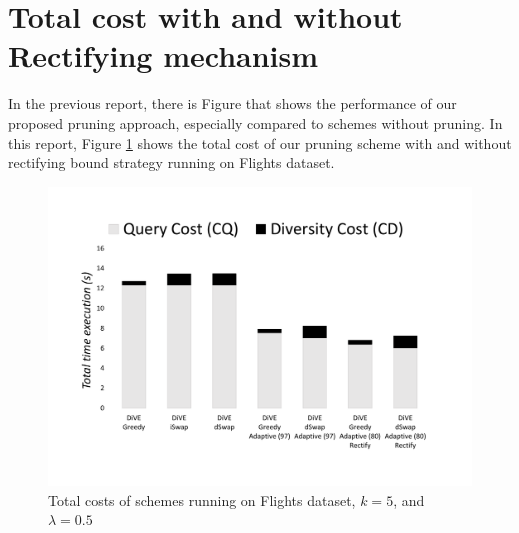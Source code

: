 \documentclass{article}
\begin{document}
%		


\section{Total cost with and without Rectifying mechanism}
In the previous report, there is Figure that shows the performance of our proposed pruning approach, especially compared to schemes without pruning. In this report, Figure \ref{fig:flight_costs_all_rectifying} shows the total cost of our pruning scheme with and without rectifying bound strategy running on Flights dataset. 

\begin{figure}
	\begin{center}
		
		\includegraphics[width=7.0in]{figures/flight_costs_rectifying}
		\vspace{-40pt}
		\caption{Total costs of schemes running on Flights dataset, $k = 5$, and $\lambda = 0.5$ }
		\label{fig:flight_costs_all_rectifying}
		\vspace{-10pt}
	\end{center}
\end{figure}
\end{document}
